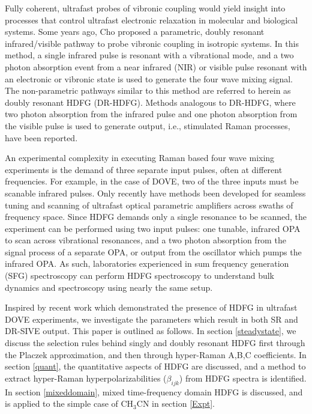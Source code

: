 \documentclass[aip, jcp, reprint, onecolumn]{revtex4-2}
\begin{document}
Fully coherent, ultrafast probes of vibronic coupling would yield insight into processes that control ultrafast electronic relaxation in molecular and biological systems. \cite{Bredenbeck2015, Arsenault2021}
Some years ago, Cho proposed a parametric, doubly resonant infrared/visible pathway to probe vibronic coupling in isotropic systems. \cite{Cho2001}
In this method, a single infrared pulse is resonant with a vibrational mode, and a two photon absorption event from a near infrared (NIR) or visible pulse resonant with an electronic or vibronic state is used to generate the four wave mixing signal.
The non-parametric pathways similar to this method are referred to herein as doubly resonant HDFG (DR-HDFG).
Methods analogous to DR-HDFG, where two photon absorption from the infrared pulse and one photon absorption from the visible pulse is used to generate output, i.e., stimulated Raman processes, have been reported. \cite{RN301, RN120} 

An experimental complexity in executing Raman based four wave mixing experiments is the demand of three separate input pulses, often at different frequencies.
For example, in the case of DOVE, two of the three inputs must be scanable infrared pulses. \cite{RN345} 
Only recently have methods been developed for seamless tuning and scanning of ultrafast optical parametric amplifiers across swaths of frequency space. \cite{RN162, McDonnell2024, SkyeOPA, KyleOPA}
Since HDFG demands only a single resonance to be scanned, the experiment can be performed using two input pulses: one tunable, infrared OPA to scan across vibrational resonances, and a two photon absorption from the signal process of a separate OPA, or output from the oscillator which pumps the infrared OPA. \cite{Wang2021}
As such, laboratories experienced in sum frequency generation (SFG) spectroscopy can perform HDFG spectroscopy to understand bulk dynamics and spectroscopy using nearly the same setup.\cite{Shen1987_CPL}

Inspired by recent work which demonstrated the presence of HDFG in ultrafast DOVE experiments, we investigate the parameters which result in both SR and DR-SIVE output. \cite{Cho2000, Bonn2024, McDonnell2024}
This paper is outlined as follows.
In section \ref{steadystate}, we discuss the selection rules behind singly and doubly resonant HDFG first through the Placzek approximation, and then through hyper-Raman A,B,C coefficients.
In section \ref{quant}, the quantitative aspects of HDFG are discussed, and a method to extract hyper-Raman hyperpolarizabilities ($\beta_{ijk}$) from HDFG spectra is identified.
In section \ref{mixeddomain}, mixed time-frequency domain HDFG is discussed, and is applied to the simple case of CH$_3$CN in section \ref{Expt}. 
\end{document}

